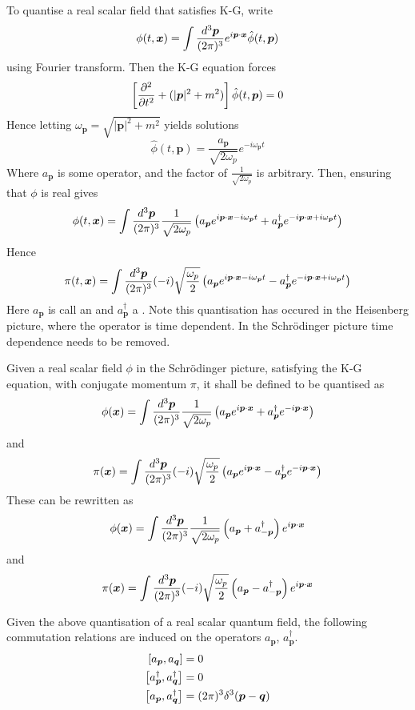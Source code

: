 \documentclass{article}
\begin{document}
\begin{example}
To quantise a real scalar field that satisfies K-G, write 
\[
\phi(t,\bm{x})=\int\tmeas e^{i\bm{p}\cdot\bm{x}} \hat{\phi}(t,\bm{p})
\]
using Fourier transform. Then the K-G equation forces 
\[
\left[\pds{t}+(|\bm{p}|^2+m^2)\right]\hat{\phi}(t,\bm{p})=0
\]
Hence letting $\omega_{\bm{p}}=\sqrt{|\bm{p}|^2+m^2}$ yields solutions 
\[
\hat{\phi}(t,\bm{p})=\frac{a_{\bm{p}}}{\sqrt{2\omega_p}} e^{-i\omega_{\bm{p}} t}
\]
Where $a_{\bm{p}}$ is some operator, and the factor of 
$\frac{1}{\sqrt{2\omega_p}}$ is arbitrary. Then, ensuring that $\phi$ is real gives 
\[
\phi(t,\bm{x})=\int\tmeas  \frac{1}{\sqrt{2\omega_p}} \left( a_{\bm{p}} e^{i\bm{p}\cdot\bm{x}-i\omega_{\bm{p}} t} + a_{\bm{p}}^\dagger e^{-i\bm{p}\cdot\bm{x}+i\omega_{\bm{p}} t} \right)
\]
Hence 
\[
\pi(t,\bm{x})=\int\tmeas  (-i)\sqrt{\frac{\omega_p}{2}} \left( a_{\bm{p}} e^{i\bm{p}\cdot\bm{x}-i\omega_{\bm{p}} t} - a_{\bm{p}}^\dagger e^{-i\bm{p}\cdot\bm{x}+i\omega_{\bm{p}} t} \right)
\]
Here $a_{\bm{p}}$ is call an  and $a_{\bm{p}}^\dagger$ a . Note this quantisation has occured in the Heisenberg picture, where the operator is time dependent. In the Schr\"odinger picture time dependence needs to be removed.
\end{example}

\begin{definition}
Given a real scalar field $\phi$ in the Schr\"odinger picture, satisfying the K-G equation, with conjugate momentum $\pi$, it shall be defined to be quantised as
\[
\phi(\bm{x})=\int\tmeas  \frac{1}{\sqrt{2\omega_p}} \left( a_{\bm{p}} e^{i\bm{p}\cdot\bm{x}} + a_{\bm{p}}^\dagger e^{-i\bm{p}\cdot\bm{x}} \right)
\]
and
\[
\pi(\bm{x})=\int\tmeas  (-i)\sqrt{\frac{\omega_p}{2}} \left( a_{\bm{p}} e^{i\bm{p}\cdot\bm{x}} - a_{\bm{p}}^\dagger e^{-i\bm{p}\cdot\bm{x}} \right)
\]
These can be rewritten as 
\[
\phi(\bm{x})=\int\tmeas  \frac{1}{\sqrt{2\omega_p}} \left( a_{\bm{p}}  + a_{-\bm{p}}^\dagger  \right)e^{i\bm{p}\cdot\bm{x}}
\]
and
\[
\pi(\bm{x})=\int\tmeas  (-i)\sqrt{\frac{\omega_p}{2}} \left( a_{\bm{p}}  - a_{-\bm{p}}^\dagger  \right)e^{i\bm{p}\cdot\bm{x}}
\]
\end{definition}

\begin{theorem}
Given the above quantisation of a real scalar quantum field, the following commutation relations are induced on the operators $a_{\bm{p}}$, $a_{\bm{p}}^\dagger$. 
\begin{align*}
    \comm[a_{\bm{p}}]{a_{\bm{q}}} &= 0 \\
    \comm[a_{\bm{p}}^\dagger]{a_{\bm{q}}^\dagger} &= 0 \\
    \comm[a_{\bm{p}}]{a_{\bm{q}}^\dagger} &= (2\pi)^3 \delta^3(\bm{p}-\bm{q})
\end{align*}
\end{theorem}
\end{document}

